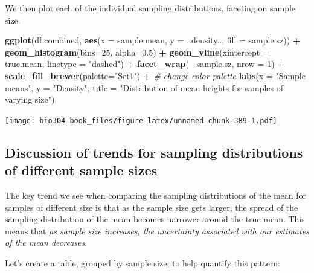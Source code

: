 \documentclass[]{book}
\newenvironment{Shaded}{\begin{snugshade}}{\end{snugshade}}
\newcommand{\CommentTok}[1]{\textcolor[rgb]{0.56,0.35,0.01}{\textit{#1}}}
\newcommand{\DataTypeTok}[1]{\textcolor[rgb]{0.13,0.29,0.53}{#1}}
\newcommand{\DecValTok}[1]{\textcolor[rgb]{0.00,0.00,0.81}{#1}}
\newcommand{\FloatTok}[1]{\textcolor[rgb]{0.00,0.00,0.81}{#1}}
\newcommand{\KeywordTok}[1]{\textcolor[rgb]{0.13,0.29,0.53}{\textbf{#1}}}
\newcommand{\NormalTok}[1]{#1}
\newcommand{\OperatorTok}[1]{\textcolor[rgb]{0.81,0.36,0.00}{\textbf{#1}}}
\newcommand{\StringTok}[1]{\textcolor[rgb]{0.31,0.60,0.02}{#1}}
\theoremstyle{definition}
\theoremstyle{definition}
\theoremstyle{definition}
\theoremstyle{remark}
\begin{document}
We then plot each of the individual sampling distributions, faceting on
sample size.

\begin{Shaded}
\begin{Highlighting}[]
\KeywordTok{ggplot}\NormalTok{(df.combined, }\KeywordTok{aes}\NormalTok{(}\DataTypeTok{x =}\NormalTok{ sample.mean, }\DataTypeTok{y =}\NormalTok{ ..density.., }\DataTypeTok{fill =}\NormalTok{ sample.sz)) }\OperatorTok{+}\StringTok{ }
\StringTok{  }\KeywordTok{geom_histogram}\NormalTok{(}\DataTypeTok{bins=}\DecValTok{25}\NormalTok{, }\DataTypeTok{alpha=}\FloatTok{0.5}\NormalTok{) }\OperatorTok{+}\StringTok{ }
\StringTok{  }\KeywordTok{geom_vline}\NormalTok{(}\DataTypeTok{xintercept =}\NormalTok{ true.mean, }\DataTypeTok{linetype =} \StringTok{"dashed"}\NormalTok{)  }\OperatorTok{+}
\StringTok{  }\KeywordTok{facet_wrap}\NormalTok{(}\OperatorTok{~}\StringTok{ }\NormalTok{sample.sz, }\DataTypeTok{nrow =} \DecValTok{1}\NormalTok{) }\OperatorTok{+}\StringTok{ }
\StringTok{  }\KeywordTok{scale_fill_brewer}\NormalTok{(}\DataTypeTok{palette=}\StringTok{"Set1"}\NormalTok{) }\OperatorTok{+}\StringTok{ }\CommentTok{# change color palette}
\StringTok{  }\KeywordTok{labs}\NormalTok{(}\DataTypeTok{x =} \StringTok{"Sample means"}\NormalTok{, }\DataTypeTok{y  =} \StringTok{"Density"}\NormalTok{,}
       \DataTypeTok{title =} \StringTok{"Distribution of mean heights for samples of varying size"}\NormalTok{)  }
\end{Highlighting}
\end{Shaded}

\texttt{[image: bio304-book\_files/figure-latex/unnamed-chunk-389-1.pdf]}

\hypertarget{discussion-of-trends-for-sampling-distributions-of-different-sample-sizes}{%
\subsection{Discussion of trends for sampling distributions of different
sample
sizes}\label{discussion-of-trends-for-sampling-distributions-of-different-sample-sizes}}

The key trend we see when comparing the sampling distributions of the
mean for samples of different size is that as the sample size gets
larger, the spread of the sampling distribution of the mean becomes
narrower around the true mean. This means that \emph{as sample size
increases, the uncertainty associated with our estimates of the mean
decreases}.

Let's create a table, grouped by sample size, to help quantify this
pattern:
\end{document}
